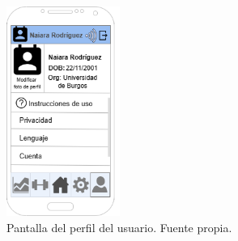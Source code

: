 \begin{figure}[h]
    \centering
    \includegraphics[width=0.33\textwidth]{img/PantallaPerfil.png}
    \caption{Pantalla del perfil del usuario. Fuente propia.}
    \label{fig:perfil} 
\end{figure}
